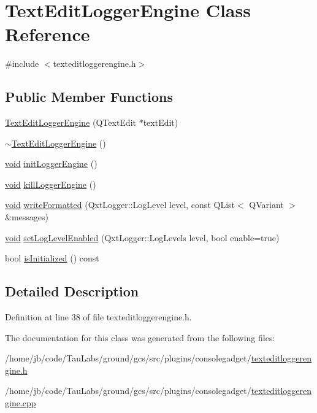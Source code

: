 \hypertarget{class_text_edit_logger_engine}{\section{\-Text\-Edit\-Logger\-Engine \-Class \-Reference}
\label{class_text_edit_logger_engine}
}


{\ttfamily \#include $<$texteditloggerengine.\-h$>$}

\subsection*{\-Public \-Member \-Functions}
\begin{DoxyCompactItemize}
\item 
\hyperlink{group___console_plugin_gaf57b0c5ea1591a2931695b3e58c8d298}{\-Text\-Edit\-Logger\-Engine} (\-Q\-Text\-Edit $\ast$text\-Edit)
\item 
\hyperlink{group___console_plugin_gaf9f579c5f0cbb1b08f7fcd3bd30f8964}{$\sim$\-Text\-Edit\-Logger\-Engine} ()
\item 
\hyperlink{group___u_a_v_objects_plugin_ga444cf2ff3f0ecbe028adce838d373f5c}{void} \hyperlink{group___console_plugin_gad4e7c7170672faefa715053b281859c2}{init\-Logger\-Engine} ()
\item 
\hyperlink{group___u_a_v_objects_plugin_ga444cf2ff3f0ecbe028adce838d373f5c}{void} \hyperlink{group___console_plugin_ga54411c88e44357048e786fb83d2abb21}{kill\-Logger\-Engine} ()
\item 
\hyperlink{group___u_a_v_objects_plugin_ga444cf2ff3f0ecbe028adce838d373f5c}{void} \hyperlink{group___console_plugin_ga2a9c1df4120a7ceeb25bafac4682e695}{write\-Formatted} (\-Qxt\-Logger\-::\-Log\-Level level, const \-Q\-List$<$ \-Q\-Variant $>$ \&messages)
\item 
\hyperlink{group___u_a_v_objects_plugin_ga444cf2ff3f0ecbe028adce838d373f5c}{void} \hyperlink{group___console_plugin_ga45c5e0aeca53547cd9b538c3cd428689}{set\-Log\-Level\-Enabled} (\-Qxt\-Logger\-::\-Log\-Levels level, bool enable=true)
\item 
bool \hyperlink{group___console_plugin_gaaf31edb9cfde3ba4fca139b77f04c0a5}{is\-Initialized} () const 
\end{DoxyCompactItemize}


\subsection{\-Detailed \-Description}


\-Definition at line 38 of file texteditloggerengine.\-h.



\-The documentation for this class was generated from the following files\-:\begin{DoxyCompactItemize}
\item 
/home/jb/code/\-Tau\-Labs/ground/gcs/src/plugins/consolegadget/\hyperlink{texteditloggerengine_8h}{texteditloggerengine.\-h}\item 
/home/jb/code/\-Tau\-Labs/ground/gcs/src/plugins/consolegadget/\hyperlink{texteditloggerengine_8cpp}{texteditloggerengine.\-cpp}\end{DoxyCompactItemize}
